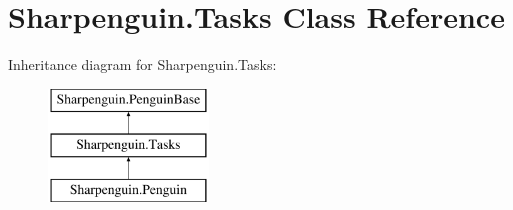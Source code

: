 \hypertarget{classSharpenguin_1_1Tasks}{\section{\-Sharpenguin.\-Tasks \-Class \-Reference}
\label{classSharpenguin_1_1Tasks}
}
\-Inheritance diagram for \-Sharpenguin.\-Tasks\-:\begin{figure}[H]
\begin{center}
\leavevmode
\includegraphics[height=3.000000cm]{classSharpenguin_1_1Tasks}
\end{center}
\end{figure}
